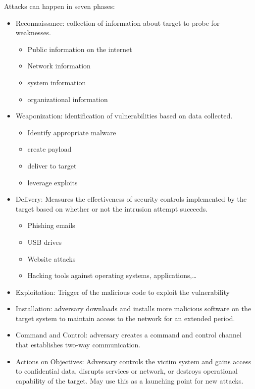 Attacks can happen in seven phases:
\begin{itemize}
    \item Reconnaissance: collection of information about target to probe for weaknesses.
    \begin{itemize}
        \item Public information on the internet
        \item Network information
        \item system information
        \item organizational information
    \end{itemize}
    \item Weaponization: identification of vulnerabilities based on data collected.
    \begin{itemize}
        \item Identify appropriate malware
        \item create payload
        \item deliver to target
        \item leverage exploits
    \end{itemize}
    \item Delivery: Measures the effectiveness of security controls implemented by the target based on whether or not the intrusion attempt succeeds.
    \begin{itemize}
        \item Phishing emails
        \item USB drives
        \item Website attacks
        \item Hacking tools against operating systems, applications,\dots
    \end{itemize}
    \item Exploitation: Trigger of the malicious code to exploit the vulnerability
    \item Installation: adversary downloads and installs more malicious software on the target system to maintain access to the network for an extended period.
    \item Command and Control: adversary creates a command and control channel that establishes two-way communication.
    \item Actions on Objectives: Adversary controls the victim system and gains access to confidential data, disrupts services or network, or destroys operational capability of the target.
    May use this as a launching point for new attacks.
\end{itemize}

